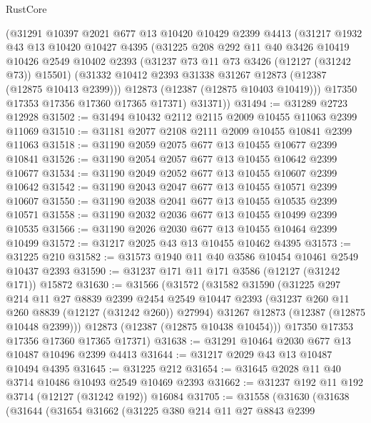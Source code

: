 \begin{lexlean}{RustCore}
\begin{coremodule}
      (@31291
        @10397
        @2021
        @677
        @13
        @10420
        @10429
        @2399
        @4413
        (@31217
          @1932
          @43
          @13
          @10420
          @10427
          @4395
          (@31225
            @208
            @292
            @11
            @40
            @3426
            @10419
            @10426
            @2549
            @10402
            @2393
            (@31237 @73 @11 @73 @3426 (@12127 (@31242 @73)) @15501)
            (@31332 @10412 @2393 @31338 @31267 @12873 (@12387 (@12875 @10413 @2399)))
            @12873
            (@12387 (@12875 @10403 @10419)))
          @17350
          @17353
          @17356
          @17360
          @17365
          @17371)
        @31371))
@31494 := @31289 @2723 @12928
@31502 := @31494 @10432 @2112 @2115 @2009 @10455 @11063 @2399 @11069
@31510 := @31181 @2077 @2108 @2111 @2009 @10455 @10841 @2399 @11063
@31518 := @31190 @2059 @2075 @677 @13 @10455 @10677 @2399 @10841
@31526 := @31190 @2054 @2057 @677 @13 @10455 @10642 @2399 @10677
@31534 := @31190 @2049 @2052 @677 @13 @10455 @10607 @2399 @10642
@31542 := @31190 @2043 @2047 @677 @13 @10455 @10571 @2399 @10607
@31550 := @31190 @2038 @2041 @677 @13 @10455 @10535 @2399 @10571
@31558 := @31190 @2032 @2036 @677 @13 @10455 @10499 @2399 @10535
@31566 := @31190 @2026 @2030 @677 @13 @10455 @10464 @2399 @10499
@31572 := @31217 @2025 @43 @13 @10455 @10462 @4395
@31573 := @31225 @210
@31582 := @31573 @1940 @11 @40 @3586 @10454 @10461 @2549 @10437 @2393
@31590 := @31237 @171 @11 @171 @3586 (@12127 (@31242 @171)) @15872
@31630 := @31566
    (@31572
      (@31582
        @31590
        (@31225
          @297
          @214
          @11
          @27
          @8839
          @2399
          @2454
          @2549
          @10447
          @2393
          (@31237 @260 @11 @260 @8839 (@12127 (@31242 @260)) @27994)
          @31267
          @12873
          (@12387 (@12875 @10448 @2399)))
        @12873
        (@12387 (@12875 @10438 @10454)))
      @17350
      @17353
      @17356
      @17360
      @17365
      @17371)
@31638 := @31291 @10464 @2030 @677 @13 @10487 @10496 @2399 @4413
@31644 := @31217 @2029 @43 @13 @10487 @10494 @4395
@31645 := @31225 @212
@31654 := @31645 @2028 @11 @40 @3714 @10486 @10493 @2549 @10469 @2393
@31662 := @31237 @192 @11 @192 @3714 (@12127 (@31242 @192)) @16084
@31705 := @31558
    (@31630
      (@31638
        (@31644
          (@31654
            @31662
            (@31225
              @380
              @214
              @11
              @27
              @8843
              @2399

\end{coremodule}
\end{lexlean}
